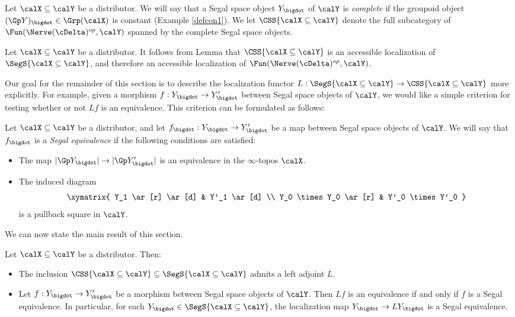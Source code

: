\begin{definition}\label{compseg}
Let $\calX \subseteq \calY$ be a distributor. We will say that a Segal space object
$Y_{\bigdot}$ of $\calY$ is {\it complete} if the groupoid object $(\Gp Y)_{\bigdot} \in \Grp(\calX)$ is constant (Example \ref{defcon1}). 
We let $\CSS{ \calX \subseteq \calY}$ denote the full subcategory of $\Fun( \Nerve(\cDelta)^{op}, \calY)$ spanned by the complete Segal space objects.
\end{definition}

\begin{remark}\label{sluther}
Let $\calX \subseteq \calY$ be a distributor. It follows from Lemma  that $\CSS{ \calX \subseteq \calY}$ is an accessible localization of
$\SegS{ \calX \subseteq \calY}$, and therefore an accessible localization of $\Fun( \Nerve(\cDelta)^{op}, \calY)$.
\end{remark}

Our goal for the remainder of this section is to describe the localization functor
$L: \SegS{ \calX \subseteq \calY} \rightarrow \CSS{ \calX \subseteq \calY}$ more
explicitly. For example, given a morphism $f: Y_{\bigdot} \rightarrow Y'_{\bigdot}$ between
Segal space objects of $\calY$, we would like a simple criterion for testing whether
or not $Lf$ is an equivalence. This criterion can be formulated as follows:

\begin{definition}\label{jinke}
Let $\calX \subseteq \calY$ be a distributor, and let $f_{\bigdot}: Y_{\bigdot} \rightarrow Y'_{\bigdot}$ be
a map between Segal space objects of $\calY$. We will say that $f_{\bigdot}$ is a {\it Segal equivalence} if the following conditions are satisfied:
\begin{itemize}
\item[$(a)$] The map $| \Gp Y_{\bigdot} | \rightarrow | \Gp Y'_{\bigdot} |$ is an equivalence in
the $\infty$-topos $\calX$.

\item[$(b)$] The induced diagram
$$ \xymatrix{ Y_1 \ar[r] \ar[d] & Y'_1 \ar[d] \\
Y_0 \times Y_0 \ar[r] & Y'_0 \times Y'_0 }$$
is a pullback square in $\calY$.
\end{itemize}
\end{definition}

We can now state the main result of this section.

\begin{theorem}\label{segmin}
Let $\calX \subseteq \calY$ be a distributor. Then:
\begin{itemize}
\item[$(1)$] The inclusion $\CSS{ \calX \subseteq \calY} \subseteq \SegS{ \calX \subseteq \calY}$
admits a left adjoint $L$.
\item[$(2)$] Let $f: Y_{\bigdot} \rightarrow Y'_{\bigdot}$ be a morphism between Segal space objects of $\calY$. Then $Lf$ is an equivalence if and only if $f$ is a Segal equivalence.
In particular, for each $Y_{\bigdot} \in \SegS{ \calX \subseteq \calY}$, the localization map
$Y_{\bigdot} \rightarrow LY_{\bigdot}$ is a Segal equivalence.
\end{itemize}
\end{theorem}

